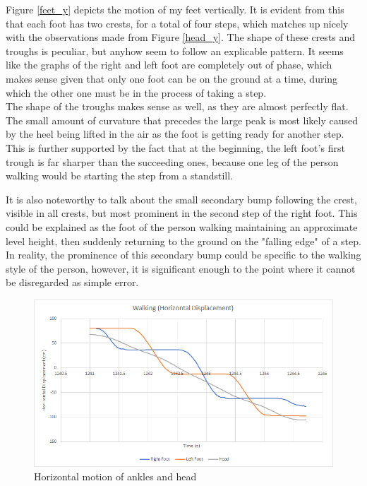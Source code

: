 \documentclass[12pt, a4paper]{article}
\begin{document}
Figure \ref{feet_y} depicts the motion of my feet vertically. It is evident from
this that each foot has two crests, for a total of four steps, which matches up
nicely with the observations made from Figure \ref{head_y}. The shape of these
crests and troughs is peculiar, but anyhow seem to follow an explicable pattern.
It seems like the graphs of the right and left foot are completely out of phase,
which makes sense given that only one foot can be on the ground at a time,
during which the other one must be in the process of taking a step. \\

The shape of the troughs makes sense as well, as they are almost perfectly flat.
The small amount of curvature that precedes the large peak is most likely caused
by the heel being lifted in the air as the foot is getting ready for another
step. This is further supported by the fact that at the beginning, the left
foot's first trough is far sharper than the succeeding ones, because one leg of
the person walking would be starting the step from a standstill.

It is also noteworthy to talk about the small secondary bump following the
crest, visible in all crests, but most prominent in the second step of the right
foot. This could be explained as the foot of the person walking maintaining an
approximate level height, then suddenly returning to the ground on the
"falling edge" of a step. In reality, the prominence of this secondary bump
could be specific to the walking style of the person, however, it is significant
enough to the point where it cannot be disregarded as simple error.

\begin{figure}[H]
    \centering
    \includegraphics[width=13cm]{motion_horiz.png}
    \caption{Horizontal motion of ankles and head}
    \label{horiz}
\end{figure}
\end{document}
